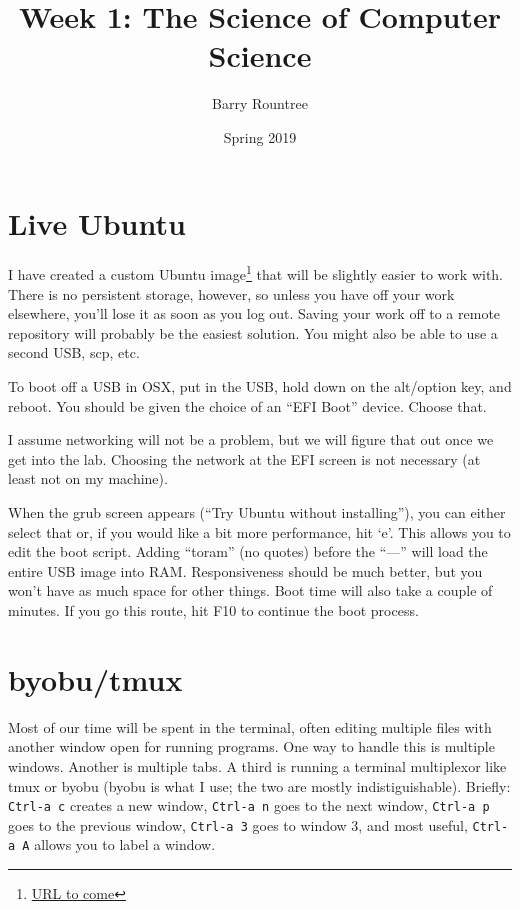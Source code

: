\documentclass{tufte-handout}
\title{Week 1:  The Science of Computer Science}
\author{Barry Rountree}
\date{Spring 2019}
\begin{document}
\maketitle%

\section{Live Ubuntu}

I have created a custom Ubuntu image\footnote{\url{URL to come}} that will be slightly
easier to work with.  There is no persistent storage, however,
so unless you have off your work elsewhere, you'll lose it as
soon as you log out. Saving your work off to a remote repository will probably be the
easiest solution.  You might also be able to use a second USB, scp, etc.

To boot off a USB in OSX, put in the USB, hold down on the alt/option key, and reboot.
You should be given the choice of an ``EFI Boot'' device.  Choose that.

I assume networking will not be a problem, but we will figure that out once we get into
the lab.  Choosing the network at the EFI screen is not necessary (at least not on my machine).

When the grub screen appears (``Try Ubuntu without installing''), you can either select that or,
if you would like a bit more performance, hit `e'.  This allows you to edit the boot 
script.  Adding ``toram'' (no quotes) before the ``---'' will load the entire USB image into
RAM.  Responsiveness should be much better, but you won't have as much space for other things.
Boot time will also take a couple of minutes.  If you go this route, hit F10 to continue the
boot process.


\section{byobu/tmux}

Most of our time will be spent in the terminal, often editing multiple files with another
window open for running programs.  One way to handle this is multiple windows.  Another is 
multiple tabs.  A third is running a terminal multiplexor like tmux or byobu (byobu is what
I use; the two are mostly indistiguishable).  Briefly:  \texttt{Ctrl-a c} creates a new
window, \texttt{Ctrl-a n} goes to the next window, \texttt{Ctrl-a p} goes to the previous
window, \texttt{Ctrl-a 3} goes to window 3, and most useful, \texttt{Ctrl-a A} allows you to
label a window.  
\end{document}
